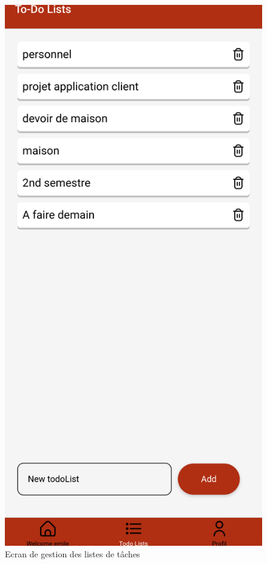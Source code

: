 \documentclass[12pt]{article}
\begin{document}
        \begin{figure}[H]
            \centering
            \includegraphics[scale=0.15]{images/taskList}
            \caption{Ecran de gestion des listes de tâches}
            \label{fig:gestion-listes}
        \end{figure}
\end{document}

